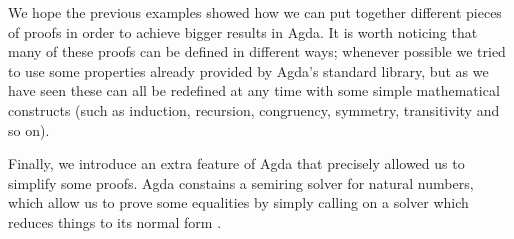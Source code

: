{We hope the previous examples showed how we can put together different pieces of proofs in order to achieve bigger results in Agda. It is worth noticing that many of these proofs can be defined in different ways; whenever possible we tried to use some properties already provided by Agda's standard library, but as we have seen these can all be redefined at any time with some simple mathematical constructs (such as induction, recursion, congruency, symmetry, transitivity and so on).

Finally, we introduce an extra feature of Agda that precisely allowed us to simplify some proofs. Agda constains a semiring solver for natural numbers, which allow us to prove some equalities by simply calling on a solver which reduces things to its normal form \cite{2018UsingSolver}.

\begin{code}%
\>[0]\AgdaSpace{}%
\<%
\\
\>[0]\AgdaSpace{}%
\<%
\\
\>[0][@{}l@{\AgdaIndent{0}}]%
\>[2]\AgdaSpace{}%
\AgdaSymbol{(}\AgdaSymbol{;}\AgdaSpace{}%
\AgdaSymbol{;}\AgdaSpace{}%
\AgdaOperator{\AgdaFunction{\AgdaUnderscore{}:=\AgdaUnderscore{}}}\AgdaSymbol{;}\AgdaSpace{}%
\AgdaSymbol{;}\AgdaSpace{}%
\AgdaSymbol{;}\AgdaSpace{}%
\AgdaOperator{\AgdaFunction{\AgdaUnderscore{}:+\AgdaUnderscore{}}}\AgdaSymbol{;}\AgdaSpace{}%
\AgdaOperator{\AgdaFunction{\AgdaUnderscore{}:*\AgdaUnderscore{}}}\AgdaSymbol{;}\AgdaSpace{}%
\AgdaOperator{\AgdaInductiveConstructor{:{-}\AgdaUnderscore{}}}\AgdaSymbol{;}\AgdaSpace{}%
\AgdaOperator{\AgdaFunction{\AgdaUnderscore{}:{-}\AgdaUnderscore{}}}\AgdaSymbol{)}\<%
\\
%
\\[\AgdaEmptyExtraSkip]%
\>[0]\<%
\\
\>[0]\<%
\\
\>[0]\<%
\\
\>[0]\<%
\\
\>[0]\<%
\\
\>[0]\<%
\\
\>[0]\<%
\end{code}

}
